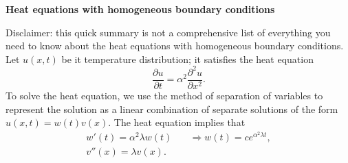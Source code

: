 \documentclass[a4paper]{article}
\theoremstyle{definition}
\numberwithin{equation}{section}
\begin{document}
\begin{center}
\large \textbf{Heat equations with homogeneous boundary conditions}
\end{center}
Disclaimer: this quick summary is not a comprehensive list of everything you need to know about the heat equations with homogeneous boundary conditions.  \\

Let $u(x,t)$ be it temperature distribution; it satisfies the heat equation
\[
\frac{\partial u}{\partial t} =\alpha^2 \frac{\partial^2u}{\partial x^2}.
\]
To solve the heat equation, we use the method of separation of variables to represent the solution as a linear combination of separate solutions of the form $u(x,t)=w(t)v(x)$.   The heat equation implies that 
\begin{align*}
w'(t)=\alpha^2 \lambda w(t) & \quad  \Longrightarrow w(t)=ce^{\alpha^2\lambda t},\\
v''(x)=\lambda v(x).\ \ &
\end{align*}
\end{document}
